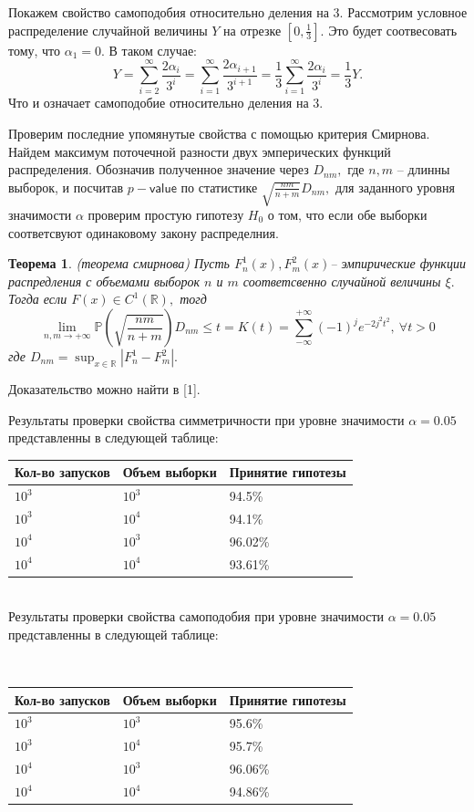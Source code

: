\documentclass[11pt]{article}
\newtheorem{theorem}{Теорема}
\numberwithin{equation}{section}
\begin{document}
Покажем свойство самоподобия относительно деления на 3. Рассмотрим условное распределение случайной величины $Y$ на отрезке $[0,\frac{1}{3}].$
Это будет соотвесовать тому, что $\alpha_1 = 0.$ В таком случае:
$$ Y = \sum_{i=2}^{\infty}\frac{2\alpha_i}{3^{i}} = \sum_{i=1}^{\infty}\frac{2\alpha_{i+1}}{3^{i+1}} = \frac{1}{3} \sum_{i=1}^{\infty}\frac{2\alpha_i}{3^i} = \frac{1}{3}Y.$$
Что и означает самоподобие относительно деления на 3.

Проверим последние упомянутые свойства с помощью критерия Смирнова. Найдем
максимум поточечной разности двух эмперических функций распределения. Обозначив
полученное значение через $D_{nm},$ где $n,m$ -- длинны выборок, и посчитав $p-\textsf{value}$ по статистике 
$\sqrt{\frac{nm}{n+m}} D_{nm},$ для заданного уровня значимости $\alpha$ проверим простую гипотезу $H_0$ о том, что если обе выборки соответсвуют одинаковому закону распределния.
\begin{theorem}
  (теорема смирнова) Пусть $F_n^1(x), F_m^2(x)$-- эмпирические функции распредления с объемами выборок $n$ и $m$ 
  соответсвенно случайной величины $\xi.$  Тогда если $F(x) \in C^1(\mathbb{R}),$ тогд
  $$ \lim_{n,m \to + \infty} \mathbb{P}(\sqrt{ \frac{nm}{n+m} })D_{nm} \leq t = K(t) = \sum_{-\infty}^{+\infty}(-1)^j e^{-2j^2t^2}, \ \forall t >0$$
  где $D_{nm} = \sup_{x\in \mathbb{R}}|F_n^1-F_m^2|.$ 
\end{theorem}
Доказательство можно найти в [1].

Результаты проверки свойства симметричности при уровне значимости $\alpha = 0.05$ представленны в следующей таблице:
\\
\begin{tabular}{ | l | l | l | }
  \hline
  Кол-во запусков & Объем выборки & Принятие гипотезы\\ \hline
  $10^3$ & $10^3$ & 94.5\% \\
  \hline
  $10^3$ & $10^4$ & 94.1\%  \\
  \hline
  $10^4$ & $10^3$ & 96.02\% \\
  \hline
  $10^4$ & $10^4$ & 93.61\% \\
  \hline
\end{tabular}
\\
Результаты проверки свойства самоподобия при уровне значимости $\alpha = 0.05$ представленны в следующей таблице:

\\
\begin{tabular}{ | l | l | l | }
  \hline
  Кол-во запусков & Объем выборки & Принятие гипотезы\\ \hline
  $10^3$ & $10^3$ & 95.6\% \\
  \hline
  $10^3$ & $10^4$ & 95.7\%  \\
  \hline
  $10^4$ & $10^3$ & 96.06\% \\
  \hline
  $10^4$ & $10^4$ & 94.86\% \\
  \hline
\end{tabular}
\\
\end{document}
